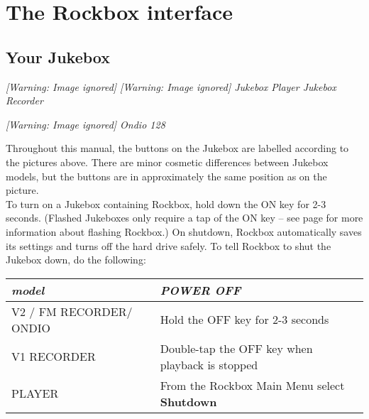 \chapter{\label{ref:PARTII}The Rockbox interface}
\clearpage
\section{Your Jukebox}
\begin{minipage}{16.554cm}
{\centering\itshape
  [Warning: Image ignored] %
   [Warning: Image ignored] %
 \newline
Jukebox Player  Jukebox Recorder
\par}

{\centering\itshape
  [Warning: Image ignored] %
 \newline
Ondio 128
\par}
\end{minipage}

Throughout this manual, the buttons on the Jukebox are labelled
according to the pictures above.  There are minor cosmetic differences
between Jukebox models, but the buttons are in approximately the same
position as on the picture.\\

To turn on a Jukebox containing Rockbox, hold down the ON key
for 2{}-3 seconds.  (Flashed Jukeboxes only require a tap of the ON key
{--} see page \textup{\pageref{ref:FlashingRockboxReal}} for more
information about flashing Rockbox.) 
\label{ref:Safeshutdown}On shutdown, Rockbox automatically saves its settings and turns off the hard drive safely. To tell Rockbox to shut the Jukebox down, do the following:

\begin{center}\begin{tabular}{|p{5.905cm}|p{10.558001cm}|}
\hline
{\centering\bfseries\itshape
model
\par}
&
{\centering\bfseries\itshape
POWER OFF
\par}
\\\hline
{\centering
V2 / FM RECORDER/ ONDIO
\par}
&
Hold  the OFF key for 2{}-3 seconds
\\\hline
{\centering
V1 RECORDER
\par}
&
Double{}-tap the OFF key when playback is stopped
\\\hline
{\centering
PLAYER
\par}
&
From the Rockbox Main Menu select \textbf{Shutdown}
\\\hline
\end{tabular}\end{center}

